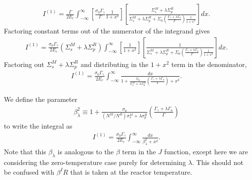 \begin{align}
  I^{(1)} = \frac{\Gamma}{2E_r} \int_{-\infty}^\infty 
  \left[ \frac{\sigma_0 \Gamma_\gamma}{\Gamma} \frac{1}{1+x^2} \right] 
  \left[ \frac{ \Sigma_s^M + \lambda \Sigma_p^R }{ 
    \Sigma_s^M +  \lambda \Sigma_p^R  + \Sigma_0 \left( \frac{\Gamma_\gamma + \lambda \Gamma_n}{\Gamma} \right) \frac{1}{1+x^2} } \right] dx .
\end{align}
Factoring constant terms out of the numerator of the integrand gives
\begin{align}
  I^{(1)} = \frac{\sigma_0 \Gamma_\gamma}{2E_r} (\Sigma_s^M + \lambda \Sigma_p^R) \int_{-\infty}^\infty 
  \left[ \frac{1}{1+x^2} \right] 
  \left[ \frac{ 1 }{ 
    \Sigma_s^M +  \lambda \Sigma_p^R  + \Sigma_0 \left( \frac{\Gamma_\gamma + \lambda \Gamma_n}{\Gamma} \right) \frac{1}{1+x^2} } \right] dx .
\end{align}
Factoring out $\Sigma_s^M + \lambda \Sigma_p^R$ and distributing in the $1 + x^2$ term in the denominator,
\begin{align}
  I^{(1)} = \frac{\sigma_0 \Gamma_\gamma}{2E_r} \int_{-\infty}^\infty  \frac{ dx }{ 
    1 + \frac{ \Sigma_0 }{\Sigma_s^M + \lambda \Sigma_p^R} \left( \frac{\Gamma_\gamma + \lambda \Gamma_n}{\Gamma} \right) + x^2 }.
\end{align}

We define the parameter
\begin{align} \label{Eq:thermalization_IRbetaSquared}
  \beta_\lambda^2 \equiv 1 + \frac{ \sigma_0 }{(N^M/N^R) \sigma_s^M + \lambda \sigma_p^R} \left( \frac{\Gamma_\gamma + \lambda \Gamma_n}{\Gamma} \right)
\end{align}
to write the integral as
\begin{align}
  I^{(1)} = \frac{\sigma_0 \Gamma_\gamma}{2E_r} \int_{-\infty}^\infty  \frac{ dx }{ \beta_\lambda^2 + x^2 }.
\end{align}
Note that this $\beta_\lambda$ is analogous to the $\beta$ term in the $J$ function, except here we are considering the zero-temperature case purely for determining $\lambda$. This should not be confused with $\beta^IR$ that is taken at the reactor temperature.

